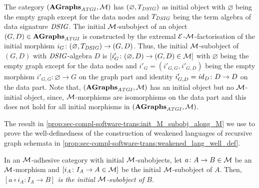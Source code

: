 \begin{example}
The category $(\mathbf{\mathbf{AGraphs}_\mathit{ATGI}},{\cal M})$ has $(\varnothing,T_\mathit{DSIG})$ as initial object with $\varnothing$ being the empty graph except for the data nodes and $T_\mathit{DSIG}$ being the term algebra of data signature $\mathit{DSIG}$.
The initial ${\cal M}$-subobject of an object $(G,D) \in \mathbf{\mathbf{AGraphs}_\mathit{ATGI}}$ is constructed by the extremal $\mathcal{E}$-${\cal M}$-factorisation of the initial morphism $i_G\colon (\varnothing,T_\mathit{DSIG}) \to (G,D)$.
Thus, the initial ${\cal M}$-subobject of $(G,D)$ with $\mathit{DSIG}$-algebra $D$ is $[i'_G\colon (\varnothing,D) \to (G,D) \in {\cal M}]$ with $\varnothing$ being the empty graph except for the data nodes and $i'_G=(i'_{G,G},i'_{G,D})$ being the empty morphism $i'_{G,G}\colon \varnothing \to G$ on the graph part and identity $i'_{G,D}=\mathit{id}_D\colon D \to D$ on the data part.
Note that, $(\mathbf{\mathbf{AGraphs}_\mathit{ATGI}},{\cal M})$ has an initial object but no ${\cal M}$-initial object, since, ${\cal M}$-morphisms are isomorphisms on the data part and this does not hold for all initial morphisms in $(\mathbf{\mathbf{AGraphs}_\mathit{ATGI}},{\cal M})$.
\envEndMarker
\end{example}

The result in \cref{prop:sec-compl-software-trans:init_M_subobj_along_M} we use to prove the well-definedness of the construction of weakened languages of recursive graph schemata in \cref{prop:sec-compl-software-trans:weakened_lang_well_def}.

\begin{proposition}
\label{prop:sec-compl-software-trans:init_M_subobj_along_M}
In an ${\cal M}$-adhesive category with initial ${\cal M}$-subobjects, let $a\colon A \to B \in {\cal M}$ be an ${\cal M}$-morphism and $[i_A\colon I_A \to A \in {\cal M}]$ be the initial ${\cal M}$-subobject of $A$.
Then, \emph{$[a \circ i_A\colon I_A \to B]$ is the initial ${\cal M}$-subobject of $B$}.
\envEndMarker
\end{proposition}

